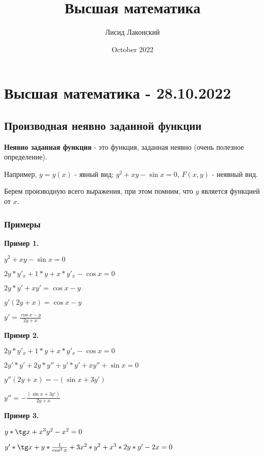 \documentclass{article}
\title{Высшая математика}
\author{Лисид Лаконский}
\date{October 2022}
\begin{document}
\maketitle

\tableofcontents
\pagebreak

\section{Высшая математика - 28.10.2022}

\subsection{Производная неявно заданной функции}

\begin{flushleft}

\textbf{Неявно заданная функция} - это функция, заданная неявно (очень полезное определение).

Например, $y = y(x)$ - явный вид; $y^2 + xy - \sin x = 0$, $F(x, y)$ - неявный вид.

\hfill

Берем производную всего выражения, при этом помним, что $y$ является функцией от $x$.

\subsubsection{Примеры}

\parbox{0.5\textwidth}{
\textbf{Пример 1.}

$y^2 + x y - \sin x = 0$

$2y * y'_x + 1 * y + x * y'_x - \cos x = 0$

$2y * y' + x y' = \cos x - y$

$y'(2y + x) = \cos x - y$

$y' = \frac{\cos x - y}{2y + x}$

\bigskip
\textbf{Пример 2.}

$2y * y'_x + 1 * y + x * y'_x - \cos x = 0$

$2y' * y' + 2y * y'' + y' * y' + xy'' + \sin x = 0$

$y''(2y + x) = -(\sin x + 3y')$

$y'' = -\frac{(\sin x + 3y')}{2y + x}$
}
\hfill
\parbox{0.4\textwidth}{
\textbf{Пример 3.}

$y * \tg x + x^3 y^2 - x^2 = 0$

$y' * \tg x + y * \frac{1}{\cos^2 x} + 3x^2 * y^2 + x^3 * 2y * y' - 2x = 0$

}
\end{flushleft}
\end{document}
